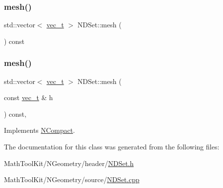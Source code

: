\mbox{\label{class_n_d_set_a18273bfd133548e2012d1c8bd7cf566c}} 
\subsubsection{\texorpdfstring{mesh()}{mesh()}\hspace{0.1cm}{\footnotesize\ttfamily [1/2]}}
{\footnotesize\ttfamily std\+::vector$<$ \mbox{\hyperlink{group___n_algebra_ga0a2cfc67e738a3d73e4f12098c4c07f6}{vec\+\_\+t}} $>$ N\+D\+Set\+::mesh (\begin{DoxyParamCaption}{ }\end{DoxyParamCaption}) const}

\mbox{\label{class_n_d_set_ae57fe6ad1422876fa4256a28c3a26a13}} 
\subsubsection{\texorpdfstring{mesh()}{mesh()}\hspace{0.1cm}{\footnotesize\ttfamily [2/2]}}
{\footnotesize\ttfamily std\+::vector$<$ \mbox{\hyperlink{group___n_algebra_ga0a2cfc67e738a3d73e4f12098c4c07f6}{vec\+\_\+t}} $>$ N\+D\+Set\+::mesh (\begin{DoxyParamCaption}\item[{const \mbox{\hyperlink{group___n_algebra_ga0a2cfc67e738a3d73e4f12098c4c07f6}{vec\+\_\+t}} \&}]{h }\end{DoxyParamCaption}) const\hspace{0.3cm}{\ttfamily [override]}, {\ttfamily [virtual]}}



Implements \mbox{\hyperlink{class_n_compact_ad4cdc60c75ca433c63f44ec13063e2fe}{N\+Compact}}.



The documentation for this class was generated from the following files\+:\begin{DoxyCompactItemize}
\item 
Math\+Tool\+Kit/\+N\+Geometry/header/\mbox{\hyperlink{_n_d_set_8h}{N\+D\+Set.\+h}}\item 
Math\+Tool\+Kit/\+N\+Geometry/source/\mbox{\hyperlink{_n_d_set_8cpp}{N\+D\+Set.\+cpp}}\end{DoxyCompactItemize}
